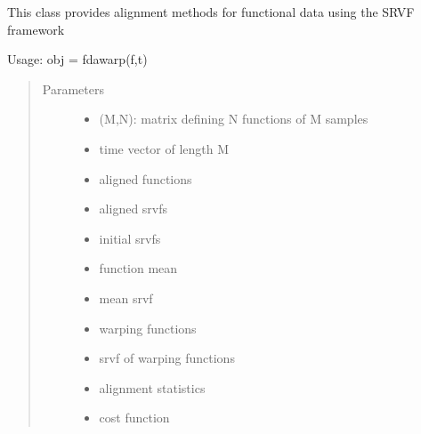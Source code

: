 \documentclass[letterpaper,10pt,english]{sphinxmanual}
\begin{document}
\begin{fulllineitems}
\label{\detokenize{time_warping:time_warping.fdawarp}}
This class provides alignment methods for functional data using the SRVF framework

Usage:  obj = fdawarp(f,t)
\begin{quote}\begin{description}
\item[{Parameters}] \leavevmode\begin{itemize}
\item {} 
 \textendash{} (M,N): matrix defining N functions of M samples

\item {} 
 \textendash{} time vector of length M

\item {} 
 \textendash{} aligned functions

\item {} 
 \textendash{} aligned srvfs

\item {} 
 \textendash{} initial srvfs

\item {} 
 \textendash{} function mean

\item {} 
 \textendash{} mean srvf

\item {} 
 \textendash{} warping functions

\item {} 
 \textendash{} srvf of warping functions

\item {} 
 \textendash{} alignment statistics

\item {} 
 \textendash{} cost function


\end{itemize}
\end{description}
\end{quote}
\end{fulllineitems}
\end{document}
